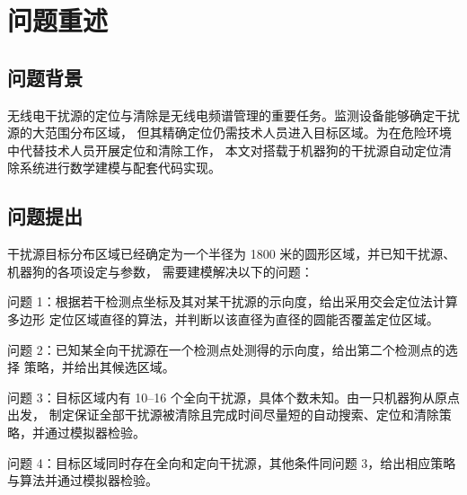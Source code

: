 \section{问题重述}
\subsection{问题背景}
无线电干扰源的定位与清除是无线电频谱管理的重要任务。监测设备能够确定干扰源的大范围分布区域，
但其精确定位仍需技术人员进入目标区域。为在危险环境中代替技术人员开展定位和清除工作，
本文对搭载于机器狗的干扰源自动定位清除系统进行数学建模与配套代码实现。

\subsection{问题提出}
干扰源目标分布区域已经确定为一个半径为 1800 米的圆形区域，并已知干扰源、机器狗的各项设定与参数，
需要建模解决以下的问题：

问题 1：根据若干检测点坐标及其对某干扰源的示向度，给出采用交会定位法计算多边形
定位区域直径的算法，并判断以该直径为直径的圆能否覆盖定位区域。

问题 2：已知某全向干扰源在一个检测点处测得的示向度，给出第二个检测点的选择
策略，并给出其候选区域。

问题 3：目标区域内有 10--16 个全向干扰源，具体个数未知。由一只机器狗从原点出发，
制定保证全部干扰源被清除且完成时间尽量短的自动搜索、定位和清除策略，并通过模拟器检验。

问题 4：目标区域同时存在全向和定向干扰源，其他条件同问题 3，给出相应策略与算法并通过模拟器检验。

